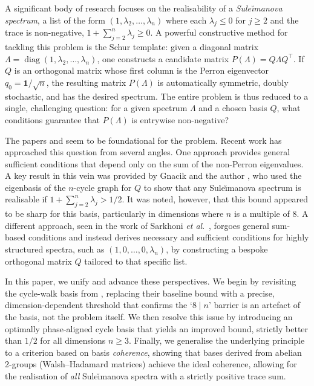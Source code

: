 \documentclass[12pt,fleqn]{amsart}
\renewcommand{\le}{\leqslant}
\renewcommand{\ge}{\geqslant}
\theoremstyle{remark}
\newcommand{\1}{\mathbf{1}}
\begin{document}
A significant body of research focuses on the realisability of a \emph{Sule\u{\i}manova spectrum}, a list of the form $(1, \lambda_2, \dots, \lambda_n)$ where each $\lambda_j \le 0$ for $j \ge 2$ and the trace is non-negative, $1 + \sum_{j=2}^n \lambda_j \ge 0$. A powerful constructive method for tackling this problem is the Schur template: given a diagonal matrix $\Lambda = \operatorname{diag}(1, \lambda_2, \dots, \lambda_n)$, one constructs a candidate matrix $P(\Lambda) = Q\Lambda Q^\top$. If $Q$ is an orthogonal matrix whose first column is the Perron eigenvector $q_0 = \mathbf{1}/\sqrt{n}$, the resulting matrix $P(\Lambda)$ is automatically symmetric, doubly stochastic, and has the desired spectrum. The entire problem is thus reduced to a single, challenging question: for a given spectrum $\Lambda$ and a chosen basis $Q$, what conditions guarantee that $P(\Lambda)$ is entrywise non-negative?\smallskip

The papers \cite{Perfect} and \cite{PM65} seem to be foundational for the problem. Recent work has approached this question from several angles. One approach provides general sufficient conditions that depend only on the sum of the non-Perron eigenvalues. A key result in this vein was provided by Gnacik and the author \cite{GK20}, who used the eigenbasis of the $n$-cycle graph for $Q$ to show that any Sule\u{\i}manova spectrum is realisable if $1 + \sum_{j=2}^n \lambda_j > 1/2$. It was noted, however, that this bound appeared to be sharp for this basis, particularly in dimensions where $n$ is a multiple of 8. A different approach, seen in the work of Sarkhoni \emph{et al}.~\cite{Sarkhoni25}, forgoes general sum-based conditions and instead derives necessary and sufficient conditions for highly structured spectra, such as $(1, 0, \dots, 0, \lambda_n)$, by constructing a bespoke orthogonal matrix $Q$ tailored to that specific list.\smallskip

In this paper, we unify and advance these perspectives. We begin by revisiting the cycle-walk basis from \cite{GK20}, replacing their baseline bound with a precise, dimension-dependent threshold that confirms the `$8 \mid n$' barrier is an artefact of the basis, not the problem itself. We then resolve this issue by introducing an optimally phase-aligned cycle basis that yields an improved bound, strictly better than $1/2$ for all dimensions $n \ge 3$. Finally, we generalise the underlying principle to a criterion based on basis \emph{coherence}, showing that bases derived from abelian 2-groups (Walsh--Hadamard matrices) achieve the ideal coherence, allowing for the realisation of \emph{all} Sule\u{\i}manova spectra with a strictly positive trace sum.\smallskip
\end{document}
